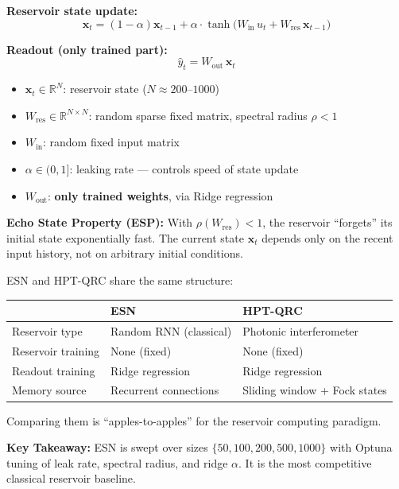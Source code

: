\documentclass[11pt]{article}
\newcommand{\mathblock}[2]{%
  \begin{tcolorbox}[mathbox, title={Math: #1}]
  #2
  \end{tcolorbox}
}
\newcommand{\example}[2]{%
  \begin{tcolorbox}[examplebox, title={Concrete Example: #1}]
  #2
  \end{tcolorbox}
}
\newcommand{\keypoint}[1]{%
  \begin{tcolorbox}[keybox]
  \textbf{Key Takeaway:} #1
  \end{tcolorbox}
}
\begin{document}
\mathblock{Echo State Network (ESN) Equations}{
\textbf{Reservoir state update:}
\[
  \mathbf{x}_t = (1-\alpha)\mathbf{x}_{t-1}
                + \alpha \cdot \tanh\!\bigl(W_{\text{in}}\, u_t
                                           + W_{\text{res}}\, \mathbf{x}_{t-1}\bigr)
\]

\textbf{Readout (only trained part):}
\[
  \hat y_t = W_{\text{out}}\, \mathbf{x}_t
\]

\begin{itemize}
  \item $\mathbf{x}_t \in \mathbb{R}^N$: reservoir state ($N \approx 200$--$1000$)
  \item $W_{\text{res}} \in \mathbb{R}^{N\times N}$: random sparse fixed matrix,
        spectral radius $\rho < 1$
  \item $W_{\text{in}}$: random fixed input matrix
  \item $\alpha \in (0,1]$: leaking rate --- controls speed of state update
  \item $W_{\text{out}}$: \textbf{only trained weights}, via Ridge regression
\end{itemize}

\textbf{Echo State Property (ESP):} With $\rho(W_{\text{res}}) < 1$, the
reservoir ``forgets'' its initial state exponentially fast. The current
state $\mathbf{x}_t$ depends only on the recent input history, not on
arbitrary initial conditions.
}

\example{Why ESN is the Main Baseline in the Paper}{
ESN and HPT-QRC share the same structure:
\begin{center}
\begin{tabular}{lll}
\toprule
& ESN & HPT-QRC \\
\midrule
Reservoir type & Random RNN (classical) & Photonic interferometer \\
Reservoir training & None (fixed) & None (fixed) \\
Readout training & Ridge regression & Ridge regression \\
Memory source & Recurrent connections & Sliding window + Fock states \\
\bottomrule
\end{tabular}
\end{center}
Comparing them is ``apples-to-apples'' for the reservoir computing paradigm.
}

\keypoint{ESN is swept over sizes $\{50, 100, 200, 500, 1000\}$ with Optuna
tuning of leak rate, spectral radius, and ridge $\alpha$. It is the most
competitive classical reservoir baseline.}
\end{document}
